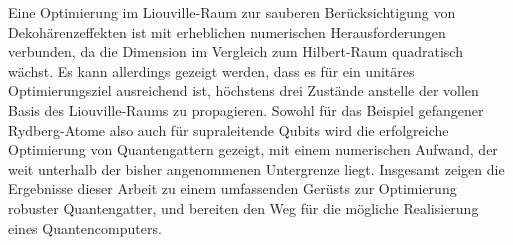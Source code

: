 Eine Optimierung im Liouville-Raum zur sauberen Berücksichtigung von
Dekohärenzeffekten ist mit erheblichen numerischen Herausforderungen verbunden,
da die Dimension im Vergleich zum Hilbert-Raum quadratisch wächst. Es kann
allerdings gezeigt werden, dass es für ein unitäres Optimierungsziel
ausreichend ist, höchstens drei Zustände anstelle der vollen Basis des
Liouville-Raums zu propagieren. Sowohl für das Beispiel gefangener Rydberg-Atome
also auch für supraleitende Qubits wird die erfolgreiche Optimierung von
Quantengattern gezeigt, mit einem numerischen Aufwand, der weit unterhalb der
bisher angenommenen Untergrenze liegt. Insgesamt zeigen die Ergebnisse dieser
Arbeit zu einem umfassenden Gerüsts zur Optimierung robuster Quantengatter, und
bereiten den Weg für die mögliche Realisierung eines Quantencomputers.
